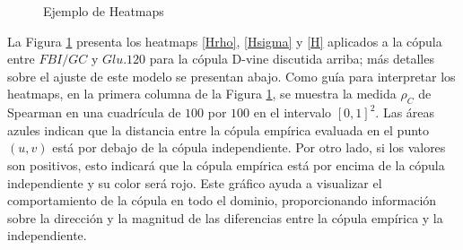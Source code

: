 \begin{figure}[H]
 \centering
    \caption{Ejemplo de Heatmaps}
    \label{heatEj}
\end{figure}

La Figura \ref{heatEj} presenta los heatmaps \eqref{Hrho}, \eqref{Hsigma} y \eqref{H} aplicados a la cópula entre $FBI/GC$ y $Glu.120$ para la cópula D-vine discutida arriba; más detalles sobre el ajuste de este modelo se presentan abajo. Como guía para interpretar los heatmaps, en la primera columna de la Figura \ref{heatEj}, se muestra la medida $\rho_C$ de Spearman en una cuadrícula de $100$ por $100$ en el intervalo $[0, 1]^2$. Las áreas azules indican que la distancia entre la cópula empírica evaluada en el punto $(u, v)$ está por debajo de la cópula independiente. Por otro lado, si los valores son positivos, esto indicará que la cópula empírica está por encima de la cópula independiente y su color será rojo. Este gráfico ayuda a visualizar el comportamiento de la cópula en todo el dominio, proporcionando información sobre la dirección y la magnitud de las diferencias entre la cópula empírica y la independiente.

